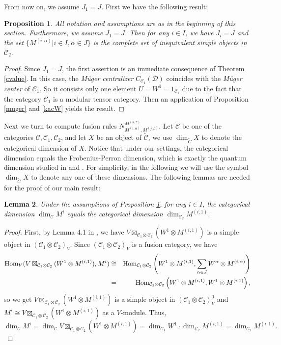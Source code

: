 \documentclass{article}
\newtheorem{lemma}{Lemma}[section]
\newtheorem{proposition}[lemma]{Proposition}
\def\CC{{\mathcal{C}}}
\def \Hom{{\rm Hom}}
\def\DD{{\mathcal{D}}}
\begin{document}
From now on, we assume $J_1=J$. First we have the following result:
\begin{proposition}\label{simpleobjects}
	All notation and assumptions are as in the beginning of this section. Furthermore, we assume $J_1=J$. Then for any $i\in I$, we have $J_i=J$ and the set $\{M^{(i,\alpha)}| i\in I, \alpha\in J\}$ is the complete set of inequivalent simple objects in $\CC_2.$
\end{proposition}
\begin{proof}
	Since $J_1=J$, the first assertion is an immediate consequence of Theorem \ref{cvalue}. In this case, the \emph{M\"uger centralizer} $C_{\CC_1}(\DD)$ coincides with the \emph{M\"uger center} of $\CC_1$. So it consists only one element $U=W^1=1_{\CC_1}$ due to the fact that the category $\CC_1$ is a modular tensor category. Then an application of Proposition \ref{muger} and \ref{kacW} yields the result.
\end{proof}

Next we turn to compute fusion rules $N_{M^{(i,\alpha)},M^{(j,\beta)}}^{M^{(k,\gamma)}}$. Let $\tilde{\CC}$ be one of the categories $\CC, \CC_1, \CC_2$, and let $X$ be an object of $\tilde{\CC}$, we use $\dim_{\tilde{C}}X$ to denote the categorical dimension of $X$. 	Notice that under our settings, the categorical dimension equals the Frobenius-Perron dimension, which is exactly the quantum dimension studied in \cite{DJX} and \cite{DRX1}. For simplicity, in the following we will use the symbol $\dim_{\tilde{C}}X$ to denote any one of these dimensions. The following lemmas are needed for the proof of our main result:
\begin{lemma}\label{catedim}
	Under the assumptions of Proposition \ref{simpleobjects}, for any $i\in I$, the categorical dimension $\dim_{\CC} M^i$ equals the categorical dimension $\dim_{\CC_2} M^{(i,1)}$.
\end{lemma}
\begin{proof}
	First, by Lemma 4.1 in \cite{DRX2}, we have $V\boxtimes_{\CC_1\otimes \CC_2}(W^1\otimes M^{(i,1)})$ is a simple object in $(\CC_1\otimes \CC_2)_V$. Since $(\CC_1\otimes \CC_2)_V$ is a fusion category, we have
	\begin{eqnarray*}
		\Hom_V(V\boxtimes_{\CC_1\otimes \CC_2}(W^1\otimes M^{(i,1)}), M^{i})
		&\cong& \Hom_{\CC_1\otimes \CC_2}\left(W^1\otimes M^{(i,1)}, \sum_{\alpha\in J}W^{\alpha}\otimes M^{(i,\alpha)}\right)\\
		&=& \Hom_{\CC_1\otimes \CC_2}\left(W^1\otimes M^{(i,1)}, W^1\otimes M^{(i,1)}\right),
	\end{eqnarray*}
	so we get $V\boxtimes_{\CC_1\otimes \CC_2}(W^1\otimes M^{(i,1)})$ is a simple object in $(\CC_1\otimes \CC_2)_V^0$ and $M^i\cong V\boxtimes_{\CC_1\otimes \CC_2}(W^1\otimes M^{(i,1)})$ as a $V$-module.
	Thus, $$\dim_{\CC}M^i=\dim_{\CC}V\boxtimes_{\CC_1\otimes \CC_2}(W^1\otimes M^{(i,1)})=\dim_{\CC_1}W^1\cdot\dim_{\CC_2}M^{(i,1)}=\dim_{\CC_2}M^{(i,1)}.$$
\end{proof}
\end{document}
